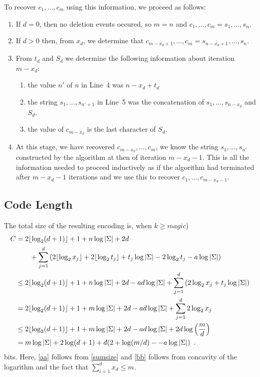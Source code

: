 \documentclass{patmorin}
\newcommand{\floor}[1]{\lfloor #1\rfloor}
\begin{document}
To recover $c_1,\ldots,c_m$ using this information, we proceed as follows:
\begin{enumerate}
  \item If $d=0$, then no deletion events occured, so $m=n$ and $c_1,\ldots,c_m = s_1,\ldots,s_n$.
  \item If $d>0$ then, from $x_d$, we determine that $c_{m-x_d+1},\ldots,c_m= s_{n-x_d+1},\ldots,s_n$.
  \item From $t_d$ and $S_d$ we determine the following information about iteration $m-x_d$:
  \begin{enumerate} 
    \item the value $n'$ of $n$ in Line~4 was $n-x_d+t_d$ 
    \item the string $s_1,\ldots,s_{n'+1}$ in Line~5 was the concatenation of $s_1,\ldots,s_{n-x_d}$ and $S_d$.
    \item the value of $c_{m-x_d}$ is the last character of $S_d$.
  \end{enumerate}
  \item At this stage, we have recovered $c_{m-x_d},\ldots,c_m$, we know the string $s_1,\ldots,s_{n'}$ constructed by the algorithm at then of iteration $m-x_d-1$.  This is all the information needed to proceed inductively as if the algorithm had terminated after $m-x_d-1$ iterations and we use this to recover $c_1,\ldots,c_{m-x_d-1}$.
\end{enumerate}

\subsection{Code Length}

The total size of the resulting encoding is, when $k \ge magic$)
\begin{align}
  C & = 2\floor{\log_2(d+1)}+1 
    + n\log|\Sigma| 
    + 2d \notag 
    \\ &\qquad {}+\sum_{j=1}^d\left(2\floor{\log_2x_j}+2\floor{\log_2 t_j}+t_j\log|\Sigma| - 2\log_2 t_j - a\log|\Sigma|\right) \notag \\ 
  & \le 2\floor{\log_2(d+1)}+1 
      + n\log|\Sigma| 
      + 2d  
      - ad\log|\Sigma| 
      + \sum_{j=1}^d\left(2\log_2x_j+t_j\log|\Sigma|\right) \notag \\ 
  & = 2\floor{\log_2(d+1)}+1 
    + m\log|\Sigma| 
    + 2d 
    - ad\log|\Sigma| 
    + \sum_{j=1}^d2\log_2x_j  \eqlabel{aa} \\ 
  & \le 2\floor{\log_2(d+1)}+1 
    + m\log|\Sigma| 
    + 2d
    - ad\log|\Sigma| 
    + 2d\log\left(\frac{m}{d}\right) \\
  & = m\log|\Sigma| + 2\log(d+1) + d(2+\log(m/d)--a\log|\Sigma|) \enspace . 
\end{align}
bits.  Here, \eqref{aa} follows from \eqref{sumsize} and \eqref{bb} follows from concavity of the logarithm and the fact that $\sum_{i=1}^d x_d\le m$.
\end{document}

